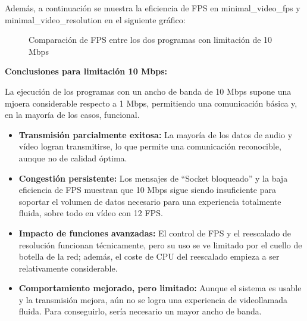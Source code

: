 Además, a continuación se muestra la eficiencia de FPS en minimal\_video\_fps y minimal\_video\_resolution en el siguiente gráfico:
\begin{figure}[H]
\centering
{}
\caption{Comparación de FPS entre los dos programas con limitación de 10 Mbps}
\label{fig:comparacionfps_10mb}
\end{figure}

\textbf{Conclusiones para limitación 10 Mbps:}

La ejecución de los programas con un ancho de banda de 10 Mbps supone una mjoera considerable respecto a 1 Mbps, permitiendo una comunicación básica y, en la mayoría de los casos, funcional.
\begin{itemize}
    \item \textbf{Transmisión parcialmente exitosa:} La mayoría de los datos de audio y vídeo logran transmitirse, lo que permite una comunicación reconocible, aunque no de calidad óptima.
    \item \textbf{Congestión persistente:} Los mensajes de ``Socket bloqueado'' y la baja eficiencia de FPS muestran que 10 Mbps sigue siendo insuficiente para soportar el volumen de datos necesario para una experiencia totalmente fluida, sobre todo en vídeo con 12 FPS.
    \item \textbf{Impacto de funciones avanzadas:} El control de FPS y el reescalado de resolución funcionan técnicamente, pero su uso se ve limitado por el cuello de botella de la red; además, el coste de CPU del reescalado empieza a ser relativamente considerable.
    \item \textbf{Comportamiento mejorado, pero limitado:} Aunque el sistema es usable y la transmisión mejora, aún no se logra una experiencia de videollamada fluida. Para conseguirlo, sería necesario un mayor ancho de banda.
\end{itemize}



